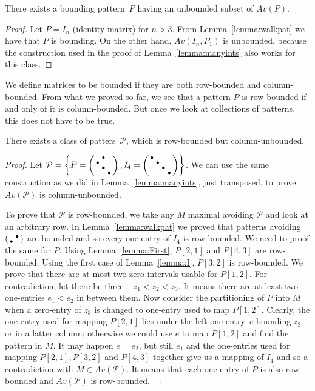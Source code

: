 \begin{obs}
There exists a bounding pattern~$P$ having an unbounded subset of $Av(P)$.
\end{obs}
\begin{proof}
Let $P=I_n$ (identity matrix) for $n>3$. From Lemma~\ref{lemma:walkpat} we have that $P$ is bounding. On the other hand, $Av(I_n,P_1)$ is unbounded, because the construction used in the proof of Lemma~\ref{lemma:manyints} also works for this class.
\end{proof}

We define matrices to be bounded if they are both row-bounded and column-bounded. From what we proved so far, we see that a pattern $P$ is row-bounded if and only of it is column-bounded. But once we look at collections of patterns, this does not have to be true.

\begin{lemma}
There exists a class of patters~$\mathcal{P}$, which is row-bounded but column-unbounded.
\end{lemma}
\begin{proof}
Let $\mathcal{P}=\left\lbrace P=\left(\begin{smallmatrix} &\bullet& \\\bullet& & \\ &\bullet& \\ & &\bullet\end{smallmatrix}\right),I_4=\left(\begin{smallmatrix}\bullet& & & \\ &\bullet& & \\ & &\bullet& \\ & & &\bullet\end{smallmatrix}\right)\right\rbrace$. We can use the same construction as we did in Lemma~\ref{lemma:manyints}, just transposed, to prove $Av(\mathcal{P})$ is column-unbounded.

To prove that $\mathcal{P}$ is row-bounded, we take any $M$ maximal avoiding $\mathcal{P}$ and look at an arbitrary row. In Lemma~\ref{lemma:walkpat} we proved that patterns avoiding $\left(\begin{smallmatrix} &\bullet\\\bullet& \end{smallmatrix}\right)$ are bounded and so every one-entry of $I_4$ is row-bounded. We need to proof the same for $P$. Using Lemma~\ref{lemma:First}, $P[2,1]$ and $P[4,3]$ are row-bounded. Using the first case of Lemma~\ref{lemma:I}, $P[3,2]$ is row-bounded. We prove that there are at most two zero-intervals usable for $P[1,2]$. For contradiction, let there be three -- $z_1<z_2<z_3$. It means there are at least two one-entries $e_1<e_2$ in between them. Now consider the partitioning of $P$ into $M$ when a zero-entry of $z_3$ is changed to one-entry used to map $P[1,2]$. Clearly, the one-entry used for mapping $P[2,1]$ lies under the left one-entry~$e$ bounding $z_3$ or in a latter column; otherwise we could use $e$ to map $P[1,2]$ and find the pattern in $M$. It may happen $e=e_2$, but still $e_1$ and the one-entries used for mapping $P[2,1],P[3,2]$ and $P[4,3]$ together give us a mapping of $I_4$ and so a contradiction with $M\in Av(\mathcal{P})$. It means that each one-entry of $P$ is also row-bounded and $Av(\mathcal{P})$ is row-bounded.
\end{proof}

